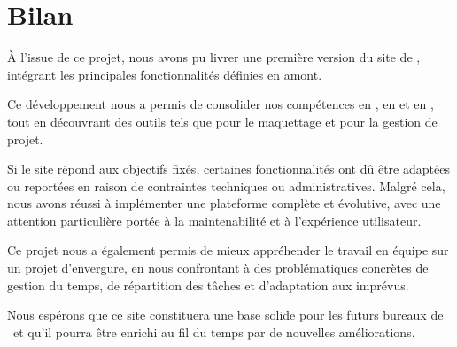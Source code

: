 \chapter{Bilan}

À l’issue de ce projet, nous avons pu livrer une première version du site de \ofni, intégrant les principales fonctionnalités définies en amont.

Ce développement nous a permis de consolider nos compétences en , en  et en , tout en découvrant des outils tels que  pour le maquettage et  pour la gestion de projet.
\bigskip

Si le site répond aux objectifs fixés, certaines fonctionnalités ont dû être adaptées ou reportées en raison de contraintes techniques ou administratives. Malgré cela, nous avons réussi à implémenter une plateforme complète et évolutive, avec une attention particulière portée à la maintenabilité et à l’expérience utilisateur.
\bigskip

Ce projet nous a également permis de mieux appréhender le travail en équipe sur un projet d’envergure, en nous confrontant à des problématiques concrètes de gestion du temps, de répartition des tâches et d’adaptation aux imprévus.
\bigskip

Nous espérons que ce site constituera une base solide pour les futurs bureaux de \ofni\ et qu’il pourra être enrichi au fil du temps par de nouvelles améliorations.
